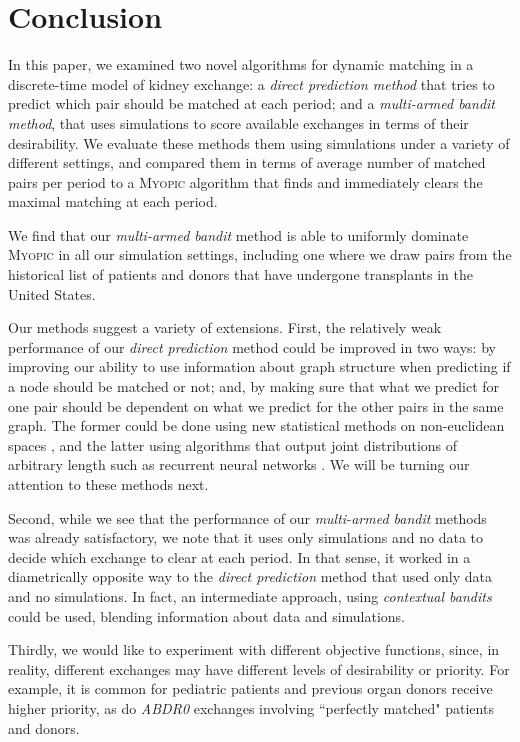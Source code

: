 \documentclass[format=acmsmall, review=false]{acmart}
\begin{document}
\section{Conclusion}

In this paper, we examined two novel algorithms for dynamic matching in a discrete-time model of kidney exchange: a \emph{direct prediction method} that tries to predict which pair should be matched at each period; and a \emph{multi-armed bandit method}, that uses simulations to score available exchanges in terms of their desirability. We evaluate these methods them using simulations under a variety of different settings, and compared them in terms of average number of matched pairs per period to a \textsc{Myopic} algorithm that finds and immediately clears the maximal matching at each period.
  
We find that our \emph{multi-armed bandit} method is able to uniformly dominate \textsc{Myopic} in all our simulation settings, including one where we draw pairs from the historical list of patients and donors that have undergone transplants in the United States.

Our methods suggest a variety of extensions. First, the relatively weak performance of our \emph{direct prediction} method could be improved in two ways: by improving our ability to use information about graph structure when predicting if a node should be matched or not; and, by making sure that what we predict for one pair should be dependent on what we predict for the other pairs in the same graph. The former could be done using new statistical methods on non-euclidean spaces \citep{shuman2013emerging}, and the latter using algorithms that output joint distributions of arbitrary length such as recurrent neural networks \citep{lecun2015deep}. We will be turning our attention to these methods next.

Second, while we see that the performance of our \emph{multi-armed bandit} methods was already satisfactory, we note that it uses only simulations and no data to decide which exchange to clear at each period. In that sense, it worked in a diametrically opposite way to the \emph{direct prediction} method that used only data and no simulations. In fact, an intermediate approach, using \emph{contextual bandits} \citep{lattimore2018bandits} could be used, blending information about data and simulations.

Thirdly, we would like to experiment with different objective functions, since, in reality, different exchanges may have different levels of desirability or priority. For example, it is common for pediatric patients and previous organ donors receive higher priority, as do \emph{ABDR0} exchanges involving ``perfectly matched" patients and donors.
\end{document}
